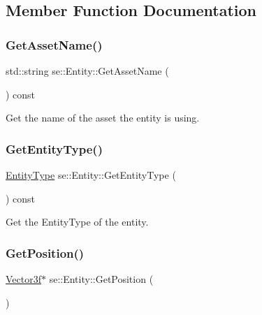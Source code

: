\subsection{Member Function Documentation}
\mbox{\label{classse_1_1_entity_af1d512cba984ffe167decd7ecf7a88f4}} 
\subsubsection{\texorpdfstring{Get\+Asset\+Name()}{GetAssetName()}}
{\footnotesize\ttfamily std\+::string se\+::\+Entity\+::\+Get\+Asset\+Name (\begin{DoxyParamCaption}{ }\end{DoxyParamCaption}) const}

Get the name of the asset the entity is using. \mbox{\label{classse_1_1_entity_aec26e9fd7f7c4c6d89e1e459a5eb028a}} 
\subsubsection{\texorpdfstring{Get\+Entity\+Type()}{GetEntityType()}}
{\footnotesize\ttfamily \mbox{\hyperlink{namespacese_ae73a909a94998bc95235eb9b16e405f1}{Entity\+Type}} se\+::\+Entity\+::\+Get\+Entity\+Type (\begin{DoxyParamCaption}{ }\end{DoxyParamCaption}) const}

Get the Entity\+Type of the entity. \mbox{\label{classse_1_1_entity_ab663eb5602597895c8275e683289e917}} 
\subsubsection{\texorpdfstring{Get\+Position()}{GetPosition()}}
{\footnotesize\ttfamily \mbox{\hyperlink{namespacese_a12e07512d95e2fdebdaf74a5ea2cf5f6}{Vector3f}}$\ast$ se\+::\+Entity\+::\+Get\+Position (\begin{DoxyParamCaption}{ }\end{DoxyParamCaption})}

